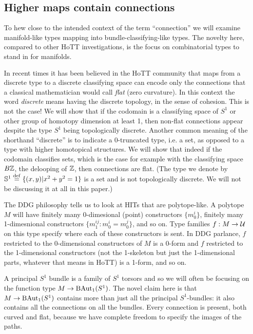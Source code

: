 \subsection{Higher maps contain connections}

To hew close to the intended context of the term ``connection'' we will examine manifold-like types mapping into bundle-classifying-like types. The novelty here, compared to other HoTT investigations, is the focus on combinatorial types to stand in for manifolds.

In recent times it has been believed in the HoTT community that maps from a discrete type to a discrete classifying space can encode only the connections that a classical mathematician would call \emph{flat} (zero curvature). In this context the word \emph{discrete} means having the discrete topology, in the sense of cohesion\cite{shulman_cohesion}. This is not the case! We will show that if the codomain is a classifying space of \( S^1 \) or other group of homotopy dimension at least 1, then non-flat connections appear despite the type \( S^1 \) being topologically discrete. Another common meaning of the shorthand ``discrete'' is to indicate a 0-truncated type, i.e. a set, as opposed to a type with higher homotopical structures. We will show that indeed if the codomain classifies sets, which is the case for example with the classifying space \( B\mathbb{Z} \), the delooping of \( \mathbb{Z} \), then connections are flat. (The type we denote by \( \mathbb{S}^1\stackrel{\mathrm{def}}{=}\{(x, y)|x^2+y^2=1\} \) is a set and is not topologically discrete. We will not be discussing it at all in this paper.)

The DDG philosophy tells us to look at HITs that are polytope-like. A polytope \( M \) will have finitely many 0-dimesional (point) constructors \( \{m_0^i\} \), finitely many 1-dimesnional constructors \( \{m_1^{ij}:m_0^i=m_0^j\} \), and so on. Type families \( f:M\to \mathcal{U} \) on this type specify where each of these constructors is sent. In DDG parlance, \( f \) restricted to the 0-dimensional constructors of \( M \) is a 0-form and \( f \) restricted to the 1-dimensional constructors (not the 1-skeleton but just the 1-dimensional parts, whatever that means in HoTT) is a 1-form, and so on.

A principal \( S^1 \) bundle is a family of \( S^1 \) torsors and so we will often be focusing on the function type \( M\to \mathrm{BAut}_1(S^1) \). The novel claim here is that \( M\to \mathrm{BAut}_1(S^1) \) contains more than just all the principal \( S^1 \)-bundles: it also contains all the connections on all the bundles. Every connection is present, both curved and flat, because we have complete freedom to specify the images of the paths.

